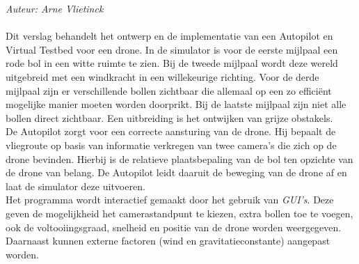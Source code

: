 \noindent
{\em Auteur: Arne Vlietinck}\\
\\
Dit verslag behandelt het ontwerp en de implementatie van een Autopilot en Virtual Testbed voor een drone. In de simulator is voor de eerste mijlpaal een rode bol in een witte ruimte te zien. Bij de tweede mijlpaal wordt deze wereld uitgebreid met een windkracht in een willekeurige richting. Voor de derde mijlpaal zijn er verschillende bollen zichtbaar die allemaal op een zo efficiënt mogelijke manier moeten worden doorprikt. Bij de laatste mijlpaal zijn niet alle bollen direct zichtbaar. Een uitbreiding is het ontwijken van grijze obstakels.
\\
De Autopilot zorgt voor een correcte aansturing van de drone. Hij bepaalt de vliegroute op basis van informatie verkregen van twee camera's die zich op de drone bevinden. Hierbij is de relatieve plaatsbepaling van de bol ten opzichte van de drone van belang. De Autopilot leidt daaruit de beweging van de drone af en laat de simulator deze uitvoeren.
\\
Het programma wordt interactief gemaakt door het gebruik van \textit{GUI's}. Deze geven de mogelijkheid het camerastandpunt te kiezen, extra bollen toe te voegen, ook de voltooiingsgraad, snelheid en positie van de drone worden weergegeven. Daarnaast kunnen externe factoren (wind en gravitatieconstante) aangepast worden.